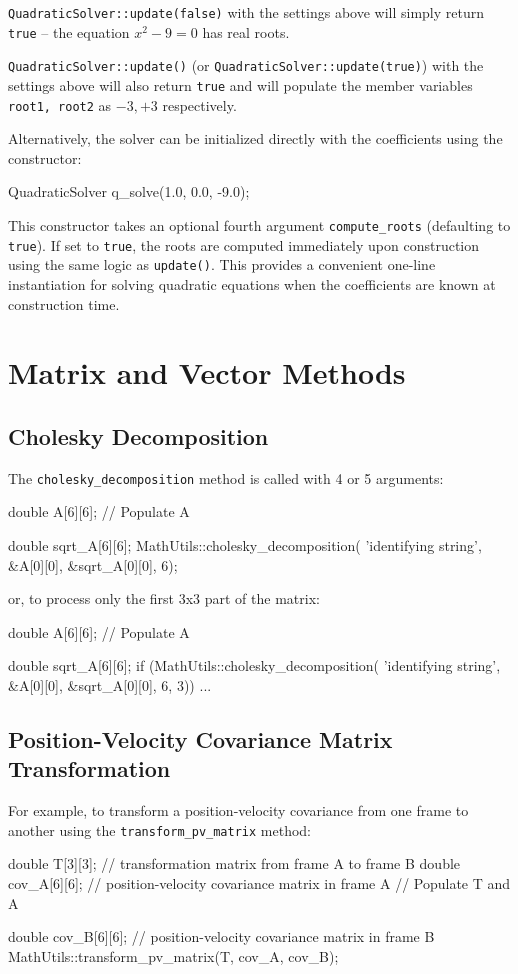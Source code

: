 \documentclass[11pt,fleqn]{report}
\begin{document}
\texttt{QuadraticSolver::update(false)} with the settings above will simply
return \texttt{true} -- the equation $x^2 - 9 = 0$ has real roots.

\texttt{QuadraticSolver::update()} (or \texttt{QuadraticSolver::update(true)})
with the settings above will also return \texttt{true} and will populate the member variables
\texttt{root1, root2} as ${-3, +3}$ respectively.

Alternatively, the solver can be initialized directly with the coefficients using the constructor:
\begin{code}
QuadraticSolver q_solve(1.0, 0.0, -9.0);
\end{code}

This constructor takes an optional fourth argument \texttt{compute\_roots} 
(defaulting to \texttt{true}). If set to \texttt{true}, the roots are computed immediately upon
construction using the same logic as \texttt{update()}. This provides a convenient one-line
instantiation for solving quadratic equations when the coefficients are known at construction time.

\section{Matrix and Vector Methods}

\subsection{Cholesky Decomposition}
The \texttt{cholesky\_decomposition} method is called with 4 or 5 arguments:
\begin{code}
double A[6][6];
// Populate A

double sqrt_A[6][6];
MathUtils::cholesky_decomposition( 'identifying string',
&A[0][0],
&sqrt_A[0][0],
6);
\end{code}
or, to process only the first 3x3 part of the matrix:
\begin{code}
double A[6][6];
// Populate A

double sqrt_A[6][6];
if (MathUtils::cholesky_decomposition( 'identifying string',
 &A[0][0],
 &sqrt_A[0][0],
 6,
 3)) {
...
}
\end{code}

\subsection{Position-Velocity Covariance Matrix Transformation}
For example, to transform a position-velocity covariance from one frame to 
another using the \texttt{transform\_pv\_matrix} method:
\begin{code}
double T[3][3]; // transformation matrix from frame A to frame B
double cov_A[6][6]; // position-velocity covariance matrix in frame A
// Populate T and A

double cov_B[6][6]; // position-velocity covariance matrix in frame B
MathUtils::transform_pv_matrix(T,
 cov_A,
 cov_B);
\end{code}
\end{document}
